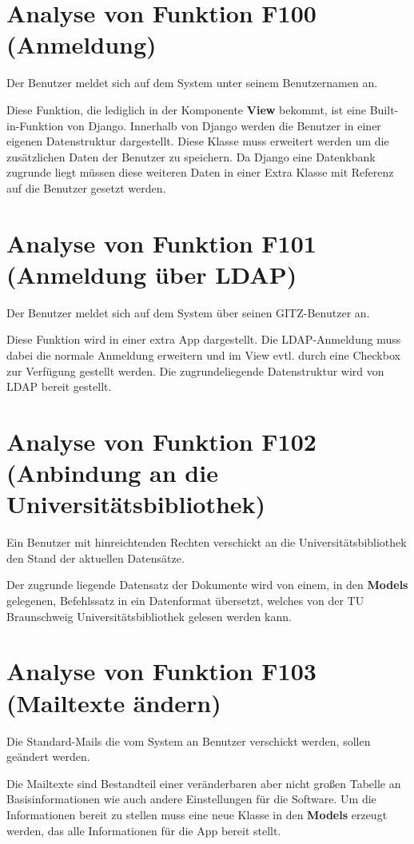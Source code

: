 \section{Analyse von Funktion F100 (Anmeldung)}
Der Benutzer meldet sich auf dem System unter seinem Benutzernamen an.

Diese Funktion, die lediglich in der Komponente \textbf{View} bekommt, ist
eine Built-in-Funktion von Django. Innerhalb von Django werden die Benutzer
in einer eigenen Datenstruktur  dargestellt. Diese Klasse muss erweitert werden
um die zusätzlichen Daten der Benutzer zu speichern. Da Django eine Datenkbank
zugrunde liegt müssen diese weiteren Daten in einer Extra Klasse mit Referenz
auf die Benutzer gesetzt werden.

\section{Analyse von Funktion F101 (Anmeldung über LDAP)}
Der Benutzer meldet sich auf dem System über seinen \Gls{GITZ}-Benutzer an.

Diese Funktion wird in einer extra App dargestellt. Die \gls{LDAP}-Anmeldung muss
dabei die normale Anmeldung erweitern und im View evtl. durch eine Checkbox zur
Verfügung gestellt werden. Die zugrundeliegende Datenstruktur wird von \gls{LDAP}
bereit gestellt.

\section{Analyse von Funktion F102 (Anbindung an die Universitätsbibliothek)}
Ein Benutzer mit hinreichtenden Rechten verschickt an die Universitätsbibliothek
den Stand der aktuellen Datensätze.

Der zugrunde liegende Datensatz der Dokumente wird von einem, in den
\textbf{Models} gelegenen, Befehlssatz in ein Datenformat übersetzt, welches von
der TU Braunschweig Universitätsbibliothek gelesen werden kann. 

\section{Analyse von Funktion F103 (Mailtexte ändern)}
Die Standard-Mails die vom System an Benutzer verschickt werden, sollen geändert
werden.

Die Mailtexte sind Bestandteil einer veränderbaren aber nicht großen Tabelle an
Basisinformationen wie auch andere Einstellungen für die Software. Um die
Informationen bereit zu stellen muss eine neue Klasse in den \textbf{Models}
erzeugt werden, das alle Informationen für die App bereit stellt.

